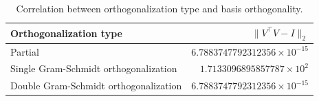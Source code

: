 \begin{table}[htbp]
\caption{Correlation between orthogonalization type and basis orthogonality.}
\centering
\label{table:orthog}
\begin{tabular}{lr}
\hline
\textbf{Orthogonalization type} & $ \|V^{\top}V - I\|_2 $ \\
\hline
Partial & $6.7883747792312356 \times 10^{-15}$ \\
Single Gram-Schmidt orthogonalization & $1.7133096895857787 \times 10^{2}$ \\
Double Gram-Schmidt orthogonalization & $6.7883747792312356 \times 10^{-15}$ \\
\hline
\end{tabular}
\end{table}
